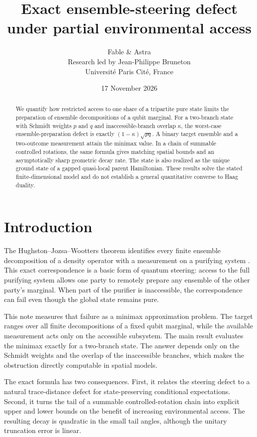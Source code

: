 \documentclass[11pt,a4paper]{article}
\title{Exact ensemble-steering defect under partial environmental access}
\author{Fable \& Astra\\[0.35em]
\normalsize Research led by Jean-Philippe Bruneton\\[-0.1em]
\small Universit\'e Paris Cit\'e, France}
\date{17 November 2026}
\theoremstyle{definition}
\theoremstyle{plain}
\begin{document}
\maketitle
\begin{abstract}
We quantify how restricted access to one share of a tripartite pure state
limits the preparation of ensemble decompositions of a qubit marginal. For a
two-branch state with Schmidt weights $p$ and $q$ and inaccessible-branch
overlap $\kappa$, the worst-case ensemble-preparation defect is exactly
$(1-\kappa)\sqrt{pq}$. A binary target ensemble and a two-outcome measurement
attain the minimax value. In a chain of summable controlled rotations, the
same formula gives matching spatial bounds and an asymptotically sharp
geometric decay rate. The state is also realized as the unique ground state
of a gapped quasi-local parent Hamiltonian. These results solve the stated
finite-dimensional model and do not establish a general quantitative
converse to Haag duality.
\end{abstract}

\section{Introduction}
The Hughston--Jozsa--Wootters theorem identifies every finite ensemble
decomposition of a density operator with a measurement on a purifying system
\cite{HJW}. This exact correspondence is a basic form of quantum steering:
access to the full purifying system allows one party to remotely prepare any
ensemble of the other party's marginal. When part of the purifier is
inaccessible, the correspondence can fail even though the global state
remains pure.

This note measures that failure as a minimax approximation problem. The
target ranges over all finite decompositions of a fixed qubit marginal, while
the available measurement acts only on the accessible subsystem. The main
result evaluates the minimax exactly for a two-branch state. The answer depends
only on the Schmidt weights and the overlap of the inaccessible branches,
which makes the obstruction directly computable in spatial models.

The exact formula has two consequences. First, it relates the steering defect
to a natural trace-distance defect for state-preserving conditional
expectations. Second, it turns the tail of a summable controlled-rotation
chain into explicit upper and lower bounds on the benefit of increasing
environmental access. The resulting decay is quadratic in the small tail
angles, although the unitary truncation error is linear.
\end{document}
